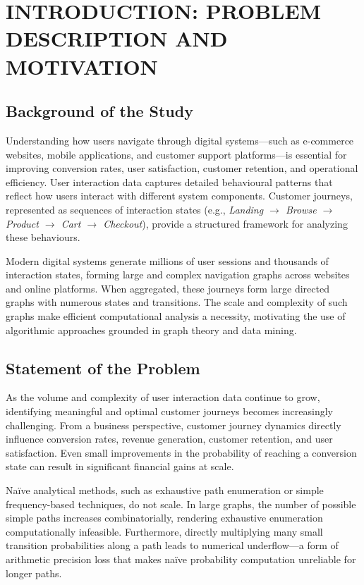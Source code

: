 \chapter{INTRODUCTION: PROBLEM DESCRIPTION AND MOTIVATION}

\section{Background of the Study}

Understanding how users navigate through digital systems---such as e-commerce websites, mobile applications, and customer support platforms---is essential for improving conversion rates, user satisfaction, customer retention, and operational efficiency. User interaction data captures detailed behavioural patterns that reflect how users interact with different system components. Customer journeys, represented as sequences of interaction states (e.g., \emph{Landing $\rightarrow$ Browse $\rightarrow$ Product $\rightarrow$ Cart $\rightarrow$ Checkout}), provide a structured framework for analyzing these behaviours.

Modern digital systems generate millions of user sessions and thousands of interaction states, forming large and complex navigation graphs across websites and online platforms. When aggregated, these journeys form large directed graphs with numerous states and transitions. The scale and complexity of such graphs make efficient computational analysis a necessity, motivating the use of algorithmic approaches grounded in graph theory and data mining.

\section{Statement of the Problem}

As the volume and complexity of user interaction data continue to grow, identifying meaningful and optimal customer journeys becomes increasingly challenging. From a business perspective, customer journey dynamics directly influence conversion rates, revenue generation, customer retention, and user satisfaction. Even small improvements in the probability of reaching a conversion state can result in significant financial gains at scale.

Na\"{i}ve analytical methods, such as exhaustive path enumeration or simple frequency-based techniques, do not scale. In large graphs, the number of possible simple paths increases combinatorially, rendering exhaustive enumeration computationally infeasible. Furthermore, directly multiplying many small transition probabilities along a path leads to numerical underflow---a form of arithmetic precision loss that makes na\"{i}ve probability computation unreliable for longer paths.

